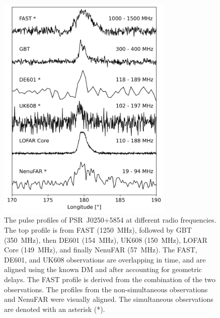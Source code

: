 \begin{figure}
    \begin{center}
    \includegraphics[width=0.75\textwidth]{Figures/J0250/profiles.png}
    \caption[Multi-frequency profiles of PSR~J0250+5854]{ The pulse profiles of PSR~J0250+5854 at different radio frequencies. The top profile is from FAST (1250~MHz), followed by GBT (350~MHz), then DE601 (154~MHz), UK608 (150~MHz), LOFAR Core (149~MHz), and finally NenuFAR (57~MHz). The FAST, DE601, and UK608 observations are overlapping in time, and are aligned using the known DM and after accounting for geometric delays. The FAST profile is derived from the combination of the two observations. The profiles from the non-simultaneous observations and NenuFAR were visually aligned. The simultaneous observations are denoted with an asterisk (*).}
    \label{fig: J0250 - profiles}
    \end{center}
\end{figure}

